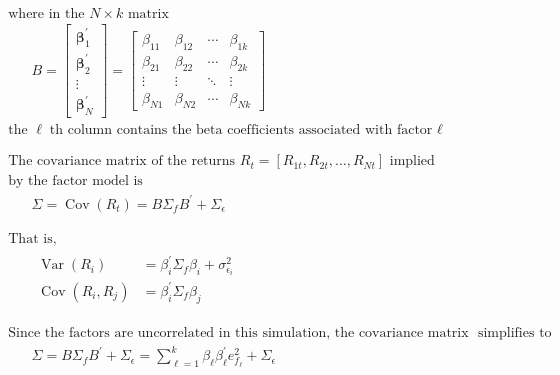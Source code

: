 \documentclass[11pt]{article}
\begin{document}
\(\begin{array}{l}{\text { where in the } N \times k \text { matrix }} \\ {\qquad B=\left[\begin{array}{c}{\boldsymbol{\beta}_{1}^{\prime}} \\ {\boldsymbol{\beta}_{2}^{\prime}} \\ {\vdots} \\ {\boldsymbol{\beta}_{N}^{\prime}}\end{array}\right]=\left[\begin{array}{cccc}{\beta_{11}} & {\beta_{12}} & {\cdots} & {\beta_{1 k}} \\ {\beta_{21}} & {\beta_{22}} & {\cdots} & {\beta_{2 k}} \\ {\vdots} & {\vdots} & {\ddots} & {\vdots} \\ {\beta_{N 1}} & {\beta_{N 2}} & {\cdots} & {\beta_{N k}}\end{array}\right]} \\ {\text { the }} \ell {\text {th column contains the beta coefficients associated with factor } \ell}\end{array}\)

\(\begin{array}{l}{\text { The covariance matrix of the returns } R_{t}=\left[R_{1 t}, R_{2 t}, \ldots, R_{N t}\right] \text { implied }} \\ {\text { by the factor model is }} \\ {\qquad \Sigma=\operatorname{Cov}\left(R_{t}\right)=B \Sigma_{f} B^{\prime}+\Sigma_{\epsilon}}\end{array}\)

\(\begin{array}{l}{\text { That is, }} \\ {\qquad \begin{aligned} \operatorname{Var}\left(R_{i}\right) &=\beta_{i}^{\prime} \Sigma_{f} \beta_{i}+\sigma_{\epsilon_{i}}^{2} \\ \operatorname{Cov}\left(R_{i}, R_{j}\right) &=\beta_{i}^{\prime} \Sigma_{f} \beta_{j} \end{aligned}}\end{array}\)

\(\begin{array}{l}{\text { Since the factors are uncorrelated in this simulation, the covariance matrix }\text { simplifies to}} \\ {\qquad \Sigma=B \Sigma_{f} B^{\prime}+\Sigma_{\epsilon}=\sum_{\ell=1}^{k} \beta_{\ell} \beta_{\ell}^{\prime} e_{f_{\ell}}^{2}+\Sigma_{\epsilon}}\end{array}\)
\end{document}
